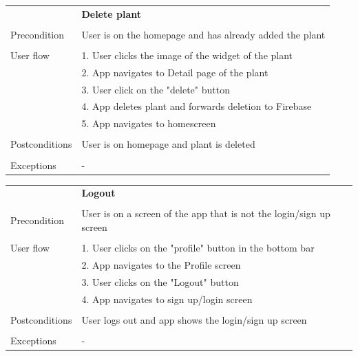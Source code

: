 \documentclass[10pt]{article}
\begin{document}
    \newline
    \newline
    \newline
    \begin{tabular}{ p{3cm}|p{8cm} }
     & \textbf{Delete plant} \\
     \\
     Precondition & User is on the homepage and has already added the plant \\ 
     \\
     User flow 
     & 1. User clicks the image of the widget of the plant \\
     & 2. App navigates to Detail page of the plant \\
     & 3. User click on the "delete" button \\
     & 4. App deletes plant and forwards deletion to Firebase \\
     & 5. App navigates to homescreen \\
     \\
     Postconditions & User is on homepage and plant is deleted \\
     \\
     Exceptions & -\\
    \end{tabular}
    \newline
    \newline
    \newline
    \begin{tabular}{ p{3cm}|p{8cm} }
     & \textbf{Logout} \\
     \\
     Precondition & User is on a screen of the app that is not the login/sign up screen \\ 
     \\
     User flow 
     & 1. User clicks on the "profile" button in the bottom bar  \\
     & 2. App navigates to the Profile screen \\ 
     & 3. User clicks on the "Logout" button \\ 
     & 4. App navigates to sign up/login screen \\
     \\
     Postconditions & User logs out and app shows the login/sign up screen \\
     \\
     Exceptions & -\\
    \end{tabular}
    
	
	
\end{document}
